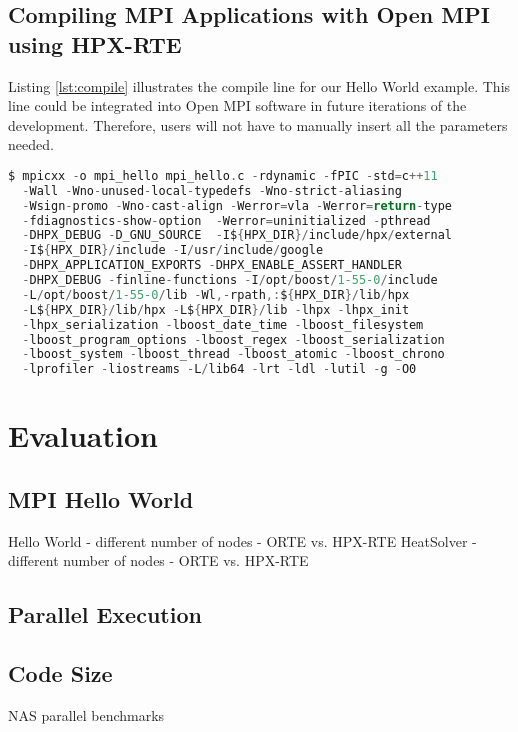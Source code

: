 \subsection{Compiling MPI Applications with Open MPI using HPX-RTE}
Listing \ref{lst:compile} illustrates the compile line for our Hello World example. This line could be integrated into Open MPI software in future iterations of the development. Therefore, users will not have to manually insert all the parameters needed.

\begin{lstlisting}[language=C, frame=single, basicstyle=\footnotesize, caption=Compile Line for Hello World\label{lst:compile}]
  $ mpicxx -o mpi_hello mpi_hello.c -rdynamic -fPIC -std=c++11
  -Wall -Wno-unused-local-typedefs -Wno-strict-aliasing
  -Wsign-promo -Wno-cast-align -Werror=vla -Werror=return-type
  -fdiagnostics-show-option  -Werror=uninitialized -pthread
  -DHPX_DEBUG -D_GNU_SOURCE  -I${HPX_DIR}/include/hpx/external
  -I${HPX_DIR}/include -I/usr/include/google
  -DHPX_APPLICATION_EXPORTS -DHPX_ENABLE_ASSERT_HANDLER
  -DHPX_DEBUG -finline-functions -I/opt/boost/1-55-0/include
  -L/opt/boost/1-55-0/lib -Wl,-rpath,:${HPX_DIR}/lib/hpx
  -L${HPX_DIR}/lib/hpx -L${HPX_DIR}/lib -lhpx -lhpx_init
  -lhpx_serialization -lboost_date_time -lboost_filesystem
  -lboost_program_options -lboost_regex -lboost_serialization
  -lboost_system -lboost_thread -lboost_atomic -lboost_chrono
  -lprofiler -liostreams -L/lib64 -lrt -ldl -lutil -g -O0
\end{lstlisting}


\section{Evaluation}

\subsection{MPI Hello World}

Hello World - different number of nodes - ORTE vs. HPX-RTE
HeatSolver - different number of nodes - ORTE vs. HPX-RTE



\subsection{Parallel Execution}

\subsection{Code Size}

NAS parallel benchmarks~\cite{bailey1991parallel}
